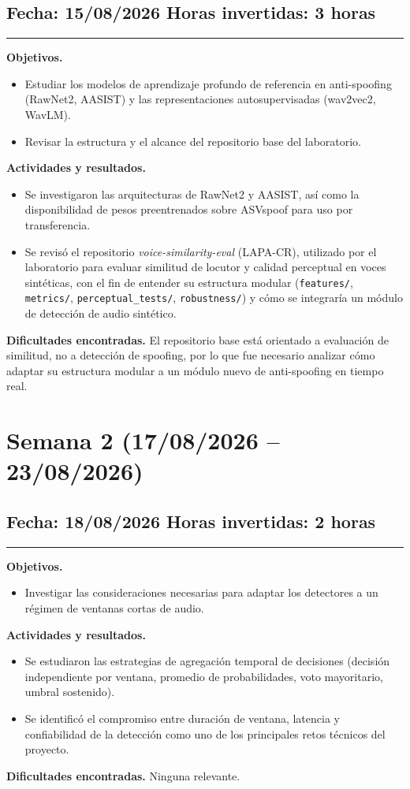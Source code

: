 \documentclass[11pt]{article}
\newenvironment{sesion}[2]{%
  \subsection*{Fecha: #1 \hfill Horas invertidas: #2}
  \vspace{-0.3cm}
  \hrule
  \vspace{0.3cm}
}{\vspace{0.5cm}}
\newcommand{\campo}[1]{\textbf{#1}}
\begin{document}
\begin{sesion}{15/08/2026}{3 horas}
\campo{Objetivos.}
\begin{itemize}
\item Estudiar los modelos de aprendizaje profundo de referencia en anti-spoofing (RawNet2, AASIST) y las representaciones autosupervisadas (wav2vec2, WavLM).
\item Revisar la estructura y el alcance del repositorio base del laboratorio.
\end{itemize}
\campo{Actividades y resultados.}
\begin{itemize}
\item Se investigaron las arquitecturas de RawNet2 y AASIST, así como la disponibilidad de pesos preentrenados sobre ASVspoof para uso por transferencia.
\item Se revisó el repositorio \textit{voice-similarity-eval} (LAPA-CR), utilizado por el laboratorio para evaluar similitud de locutor y calidad perceptual en voces sintéticas, con el fin de entender su estructura modular (\texttt{features/}, \texttt{metrics/}, \texttt{perceptual\_tests/}, \texttt{robustness/}) y cómo se integraría un módulo de detección de audio sintético.
\end{itemize}
\campo{Dificultades encontradas.} El repositorio base está orientado a evaluación de similitud, no a detección de spoofing, por lo que fue necesario analizar cómo adaptar su estructura modular a un módulo nuevo de anti-spoofing en tiempo real.
\end{sesion}

\section{Semana 2 (17/08/2026 -- 23/08/2026)}

\begin{sesion}{18/08/2026}{2 horas}
\campo{Objetivos.}
\begin{itemize}
\item Investigar las consideraciones necesarias para adaptar los detectores a un régimen de ventanas cortas de audio.
\end{itemize}
\campo{Actividades y resultados.}
\begin{itemize}
\item Se estudiaron las estrategias de agregación temporal de decisiones (decisión independiente por ventana, promedio de probabilidades, voto mayoritario, umbral sostenido).
\item Se identificó el compromiso entre duración de ventana, latencia y confiabilidad de la detección como uno de los principales retos técnicos del proyecto.
\end{itemize}
\campo{Dificultades encontradas.} Ninguna relevante.
\end{sesion}
\end{document}
